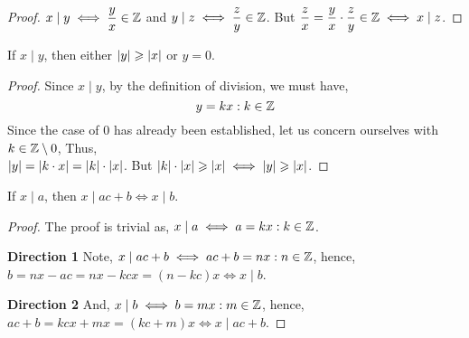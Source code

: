 
\begin{proof}
    \( x \mid y \iff \dfrac{y}{x} \in \mathbb Z \) and \(  y \mid z \iff \dfrac{z}{y} \in \mathbb Z \). 
    But \( \dfrac{z}{x}= \dfrac{y}{x}\cdot\dfrac{z}{y} \in \mathbb Z \iff x\mid z\).
\end{proof}



\begin{theorem}
    If \(x \mid y\), then either \(\abs{y} \geqslant \abs{x} \) or \(y=0\).
\end{theorem}


\begin{proof}
    Since \(x \mid y\), by the definition of division, we must have, \[
        y = kx : k \in \mathbb Z
    \] Since the case of \(0\) has already been established, let us concern ourselves with
    \(k \in \mathbb Z \setminus 0\), Thus,\\
    \(\abs{y}=\abs{k\cdot x}= \abs{k}\cdot \abs{x}\). But \( \abs{k}\cdot \abs{x} \geqslant \abs{x} \iff \abs{y} \geqslant \abs{x}\).
\end{proof}


\begin{lemma}
    \label{lem: unimp}
    If \(x \mid a\), then \(x \mid ac+b \iff x\mid b\).
\end{lemma}

\begin{proof}
    The proof is trivial as, \(x \mid a \iff a = kx : k \in \mathbb Z\).
    \par 
    \textbf{Direction 1}
    Note, \(x \mid ac+b \iff ac+b=nx : n \in \mathbb Z\), hence, \(b=nx-ac=nx-kcx=(n-kc)x \iff x \mid b\).
    \par
    \textbf{Direction 2}
    And, \(x\mid b \iff b=mx : m \in \mathbb Z \), hence, \(ac+b=kcx+mx=(kc+m)x \iff x \mid ac+b \).
\end{proof}

